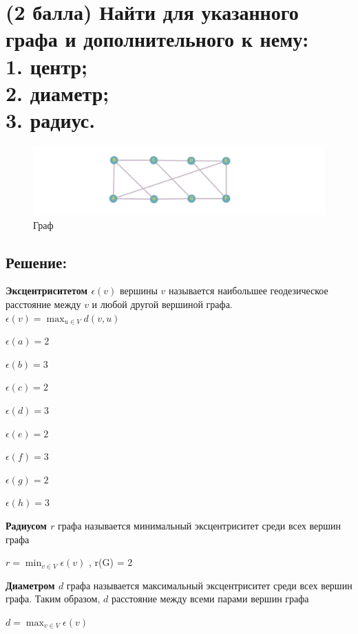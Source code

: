 \documentclass{article}
\begin{document}
\section{\Large{ (2 балла) Найти для указанного графа и дополнительного к
нему: \\ 1. центр; \\2. диаметр; \\ 3. радиус.
}}

\begin{figure}[h]
    \centering
    \includegraphics[width=\textwidth,height=\textheight,keepaspectratio]{3.png}
    \caption{Граф}
    \label{fig:my_label}
\end{figure}

\subsection*{Решение:}
\textbf{Эксцентриситетом $\epsilon(v)$} вершины $v$ называется наибольшее геодезическое расстояние между $v$ и любой другой вершиной графа. \\
${\displaystyle \epsilon (v)=\max _{u\in V}d(v,u)}$ 
\bigskip

$\epsilon(a) = 2$

$\epsilon(b) = 3$

$\epsilon(c) = 2$

$\epsilon(d) = 3$

$\epsilon(e) = 2$

$\epsilon(f) = 3$

$\epsilon(g) = 2$

$\epsilon(h) = 3$

\bigskip

\textbf{Радиусом $r$} графа называется минимальный эксцентриситет среди всех вершин графа

${\displaystyle r=\min _{v\in V}\epsilon (v)}$ , 
\Large\textbf{} r(G) = 2

\bigskip

\textbf{Диаметром $d$} графа называется максимальный эксцентриситет среди всех вершин графа. Таким образом, $d$ расстояние между всеми парами вершин графа

${\displaystyle d=\max _{v\in V}\epsilon (v)}$
\end{document}
